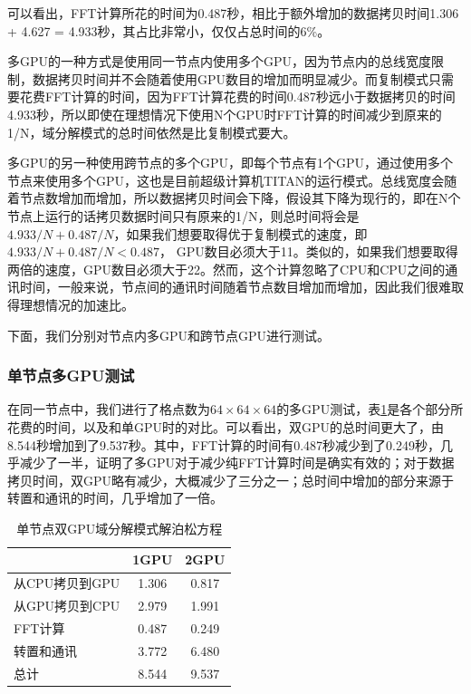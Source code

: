 可以看出，FFT计算所花的时间为0.487秒，相比于额外增加的数据拷贝时间1.306 + 4.627 = 4.933秒，其占比非常小，仅仅占总时间的6\%。

多GPU的一种方式是使用同一节点内使用多个GPU，因为节点内的总线宽度限制，数据拷贝时间并不会随着使用GPU数目的增加而明显减少。而复制模式只需要花费FFT计算的时间，因为FFT计算花费的时间0.487秒远小于数据拷贝的时间4.933秒，所以即使在理想情况下使用N个GPU时FFT计算的时间减少到原来的1/N，域分解模式的总时间依然是比复制模式要大。

多GPU的另一种使用跨节点的多个GPU，即每个节点有1个GPU，通过使用多个节点来使用多个GPU，这也是目前超级计算机TITAN的运行模式。总线宽度会随着节点数增加而增加，所以数据拷贝时间会下降，假设其下降为现行的，即在N个节点上运行的话拷贝数据时间只有原来的1/N，则总时间将会是 $4.933/N+0.487/N$，如果我们想要取得优于复制模式的速度，即 $4.933/N+0.487/N<0.487$， GPU数目必须大于11。类似的，如果我们想要取得两倍的速度，GPU数目必须大于22。然而，这个计算忽略了CPU和CPU之间的通讯时间，一般来说，节点间的通讯时间随着节点数目增加而增加，因此我们很难取得理想情况的加速比。

下面，我们分别对节点内多GPU和跨节点GPU进行测试。

\subsubsection{单节点多GPU测试}
在同一节点中，我们进行了格点数为$64 \times 64 \times 64$的多GPU测试，表\ref{tab:2GPU_Poisson}是各个部分所花费的时间，以及和单GPU时的对比。可以看出，双GPU的总时间更大了，由8.544秒增加到了9.537秒。其中，FFT计算的时间有0.487秒减少到了0.249秒，几乎减少了一半，证明了多GPU对于减少纯FFT计算时间是确实有效的；对于数据拷贝时间，双GPU略有减少，大概减少了三分之一；总时间中增加的部分来源于转置和通讯的时间，几乎增加了一倍。
\begin{table}[!htbp]
    \centering
    \footnotesize%
    \setlength{\tabcolsep}{4pt}%
    \renewcommand{\arraystretch}{1.2}%
    \begin{tabular}{lcc}
        \hline\hline
                          & 1GPU    & 2GPU   \\
        \hline\hline
        从CPU拷贝到GPU    & 1.306   & 0.817  \\
        \hline
        从GPU拷贝到CPU    & 2.979   & 1.991  \\
        \hline
        FFT计算           & 0.487   & 0.249  \\
        \hline
        转置和通讯        & 3.772   & 6.480  \\
        \hline
        总计              & 8.544   & 9.537  \\
        \hline\hline
    \end{tabular}
    \caption{单节点双GPU域分解模式解泊松方程}
    \label{tab:2GPU_Poisson}
\end{table}


